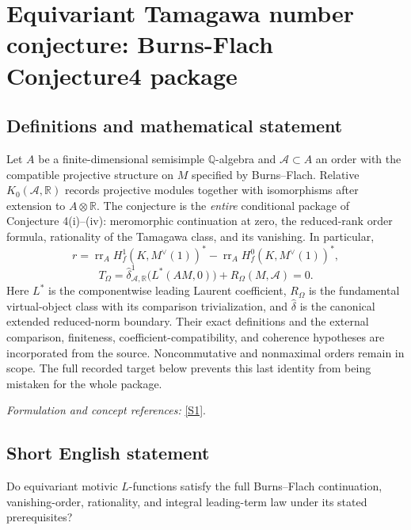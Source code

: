 \documentclass[11pt]{article}
\begin{document}
\section*{\texorpdfstring{Equivariant Tamagawa number conjecture: Burns-Flach Conjecture4 package}{Equivariant Tamagawa number conjecture: Burns-Flach Conjecture4 package}}\label{30006700}
\subsection{Definitions and mathematical statement}
Let $A$ be a finite-dimensional semisimple ${\mathbb{Q}}$-algebra and $\mathcal A\subset A$ an order with the compatible projective structure on $M$ specified by Burns--Flach. Relative $K_0(\mathcal A,{\mathbb{R}})$ records projective modules together with isomorphisms after extension to $A\otimes{\mathbb{R}}$. The conjecture is the \emph{entire} conditional package of Conjecture 4(i)--(iv): meromorphic continuation at zero, the reduced-rank order formula, rationality of the Tamagawa class, and its vanishing. In particular,
\[
 r=\operatorname{rr}_A H_f^1(K,M^\vee(1))^*
   -\operatorname{rr}_A H_f^0(K,M^\vee(1))^*,
\]
\[
 T_\Omega=\widehat\delta^1_{\mathcal A,{\mathbb{R}}}\bigl(L^*(AM,0)\bigr)
             +R_\Omega(M,\mathcal A)=0.
\]
Here $L^*$ is the componentwise leading Laurent coefficient, $R_\Omega$ is the fundamental virtual-object class with its comparison trivialization, and $\widehat\delta$ is the canonical extended reduced-norm boundary. Their exact definitions and the external comparison, finiteness, coefficient-compatibility, and coherence hypotheses are incorporated from the source. Noncommutative and nonmaximal orders remain in scope. The full recorded target below prevents this last identity from being mistaken for the whole package.
\par\smallskip\textit{Formulation and concept references:} \href{https://ems.press/content/serial-article-files/25892}{[S1]}.

\subsection{Short English statement}
Do equivariant motivic $L$-functions satisfy the full Burns--Flach continuation, vanishing-order, rationality, and integral leading-term law under its stated prerequisites?
\end{document}

